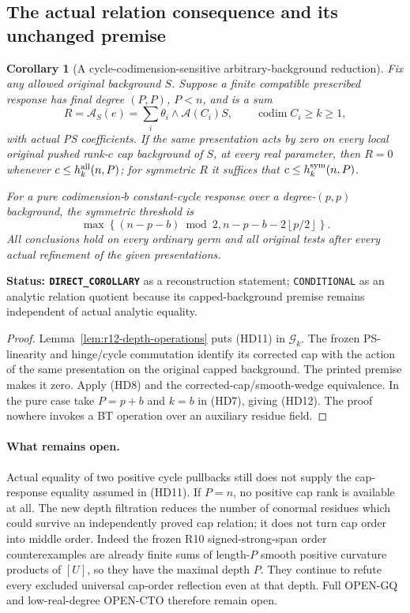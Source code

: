 \documentclass[11pt,a4paper]{article}
\numberwithin{equation}{section}
\newtheorem{corollary}[theorem]{Corollary}
\theoremstyle{definition}
\theoremstyle{remark}
\begin{document}
\subsection{The actual relation consequence and its unchanged premise}

\begin{corollary}[A cycle-codimension-sensitive arbitrary-background reduction]
\label{cor:r12-depth-analytic-response}
Fix any allowed original background $S$. Suppose a finite compatible
prescribed response has final degree $(P,P)$, $P<n$, and is a sum
\[
                R=\mathcal A_S(e)
                     =\sum_i\theta_i\wedge\mathcal A(C_i)S,
                \qquad\operatorname{codim}C_i\ge k\ge1,
 \tag{HD11}
\]
with actual PS coefficients. If the same presentation acts by zero
on every local original pushed rank-$c$ cap background of $S$, at
every real parameter, then $R=0$ whenever
$c\le h_k^{\rm all}(n,P)$; for symmetric $R$ it suffices that
$c\le h_k^{\rm sym}(n,P)$.

For a pure codimension-$b$ constant-cycle response over a
degree-$(p,p)$ background, the symmetric threshold is
\[
       \max\left\{(n-p-b)\bmod2,
                    n-p-b-2\left\lfloor p/2\right\rfloor\right\}.
 \tag{HD12}
\]
All conclusions hold on every ordinary germ and all original tests
after every actual refinement of the given presentations.
\end{corollary}

\noindent\textbf{Status: \texttt{DIRECT\_COROLLARY}} as a
reconstruction statement; \texttt{CONDITIONAL} as an analytic
relation quotient because its capped-background premise remains
independent of actual analytic equality.

\begin{proof}
Lemma~\ref{lem:r12-depth-operations} puts (HD11) in $\mathscr G_k$.
The frozen PS-linearity and hinge/cycle commutation identify its
corrected cap with the action of the same presentation on the
original capped background. The printed premise makes it zero.
Apply (HD8) and the corrected-cap/smooth-wedge equivalence. In the
pure case take $P=p+b$ and $k=b$ in (HD7), giving (HD12).
The proof nowhere invokes a BT operation over an auxiliary residue
field.
\end{proof}

\paragraph{What remains open.}
Actual equality of two positive cycle pullbacks still does not supply
the cap-response equality assumed in (HD11). If $P=n$, no positive
cap rank is available at all. The new depth filtration reduces the
number of conormal residues which could survive an independently
proved cap relation; it does not turn cap order into middle order.
Indeed the frozen R10 signed-strong-span order counterexamples are
already finite sums of length-$P$ smooth positive curvature products
of $[U]$, so they have the maximal depth $P$. They continue to refute
every excluded universal cap-order reflection even at that depth.
Full OPEN-GQ and low-real-degree OPEN-CTO therefore remain open.
\end{document}
